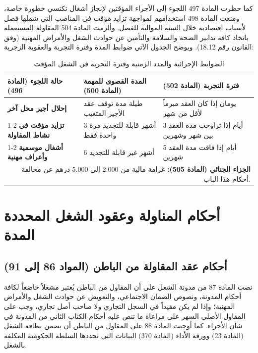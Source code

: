 كما حظرت المادة \textenglish{497} اللجوء إلى الأجراء المؤقتين لإنجاز أشغال تكتسي خطورة خاصة، ومنعت المادة \textenglish{498} استخدامهم لمواجهة تزايد مؤقت في المناصب التي شملها فصل لأسباب اقتصادية خلال السنة الموالية للفصل. وألزمت المادة \textenglish{504} المقاولة المستعملة باتخاذ كافة تدابير الصحة والسلامة والتأمين عن حوادث الشغل والأمراض المهنية (وفق القانون رقم \textenglish{18.12}). ويوضح الجدول الآتي ضوابط المدة وفترة التجربة والعقوبة الزجرية:

\begin{table}[htbp]
\centering
\small
\renewcommand{\arraystretch}{1.55}
\begin{tabularx}{\textwidth}{|p{4.5cm}|p{4.5cm}|X|}
\hline
\textbf{حالة اللجوء (المادة \textenglish{496})} & \textbf{المدة القصوى للمهمة (المادة \textenglish{500})} & \textbf{فترة التجربة (المادة \textenglish{502})} \\
\hline
\textbf{إحلال أجير محل آخر} & طيلة مدة توقف عقد الأجير المتغيب & يومان إذا كان العقد مبرماً لأقل من شهر \\
\cline{1-2}
\textbf{تزايد مؤقت في نشاط المقاولة} & \textenglish{3} أشهر قابلة للتجديد مرة واحدة فقط & \textenglish{3} أيام إذا تراوحت مدة العقد بين شهر وشهرين \\
\cline{1-2}
\textbf{أشغال موسمية وأعراف مهنية} & \textenglish{6} أشهر غير قابلة للتجديد & \textenglish{5} أيام إذا فاقت مدة العقد شهرين \\
\hline
\multicolumn{3}{|r|}{\textbf{الجزاء الجنائي (المادة \textenglish{505}):} غرامة مالية من \textenglish{2.000} إلى \textenglish{5.000} درهم عن مخالفة أحكام هذا الباب.} \\
\hline
\end{tabularx}
\caption{الضوابط الإجرائية والمدد الزمنية وفترة التجربة في الشغل المؤقت}
\label{tab:durees-temporaire}
\end{table}

\section{أحكام المناولة وعقود الشغل المحددة المدة}

\subsection{أحكام عقد المقاولة من الباطن (المواد 86 إلى 91)}
نصت المادة \textenglish{87} من مدونة الشغل على أن المقاول من الباطن يُعتبر مشغلاً خاضعاً لكافة أحكام المدونة، ونصوص الضمان الاجتماعي، والتعويض عن حوادث الشغل والأمراض المهنية؛ وإذا لم يكن مقيداً في السجل التجاري ولا صاحب أصل تجاري، وجب على المقاول الأصلي السهر على مراعاة ما تنص عليه أحكام الكتاب الثاني من المدونة في شأن الأجراء. كما أوجبت المادة \textenglish{88} على المقاول من الباطن أن يضمن بطاقة الشغل (المادة \textenglish{23}) وورقة الأداء (المادة \textenglish{370}) البيانات التي تحددها السلطة الحكومية المكلفة بالشغل.

